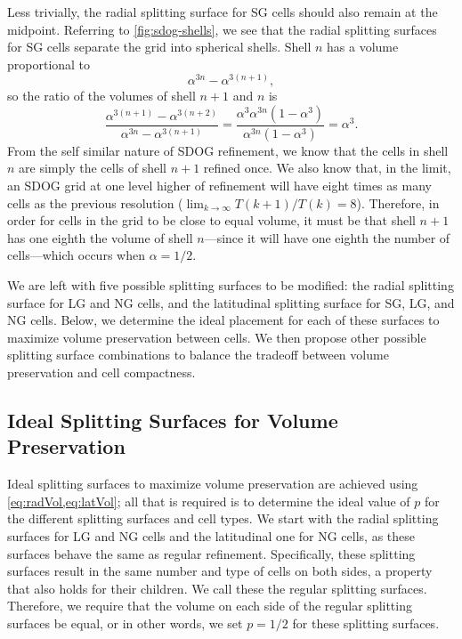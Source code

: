 Less trivially, the radial splitting surface for SG cells should also remain at the midpoint.
Referring to \cref{fig:sdog-shells}, we see that the radial splitting surfaces for SG cells separate the grid into spherical shells.
Shell $n$ has a volume proportional to
%
\begin{equation*}
\alpha^{3n} - \alpha^{3 \left( n + 1 \right)},
\end{equation*}
%
so the ratio of the volumes of shell $n+1$ and $n$ is
%
\begin{equation} \label{eq:shellVolume}
\frac{ \alpha^{3 \left(n + 1 \right)} - \alpha^{3\left( n + 2 \right)} }{ \alpha^{3n} - \alpha^{3 \left( n + 1 \right)} } = \frac{ \alpha^{3} \alpha^{3n} \left( 1 - \alpha^{3} \right) }{ \alpha^{3n} \left( 1 - \alpha^{3} \right) } = \alpha^{3}.
\end{equation}
%
From the self similar nature of SDOG refinement, we know that the cells in shell $n$ are simply the cells of shell $n+1$ refined once.
We also know that, in the limit, an SDOG grid at one level higher of refinement will have eight times as many cells as the previous resolution ($\lim_{k \to \infty} T(k+1) / T(k)  = 8 $).
Therefore, in order for cells in the grid to be close to equal volume, it must be that shell $n+1$ has one eighth the volume of shell $n$---since it will have one eighth the number of cells---which occurs when $\alpha = 1 / 2$.


We are left with five possible splitting surfaces to be modified: the radial splitting surface for LG and NG cells, and the latitudinal splitting surface for SG, LG, and NG cells.
Below, we determine the ideal placement for each of these surfaces to maximize volume preservation between cells.
We then propose other possible splitting surface combinations to balance the tradeoff between volume preservation and cell compactness.


\subsection{Ideal Splitting Surfaces for Volume Preservation} \label{chap:4:ideal}
Ideal splitting surfaces to maximize volume preservation are achieved using \cref{eq:radVol,eq:latVol}; all that is required is to determine the ideal value of $p$ for the different splitting surfaces and cell types.
We start with the radial splitting surfaces for LG and NG cells and the latitudinal one for NG cells, as these surfaces behave the same as regular refinement.
Specifically, these splitting surfaces result in the same number and type of cells on both sides, a property that also holds for their children.
We call these the regular splitting surfaces.
Therefore, we require that the volume on each side of the regular splitting surfaces be equal, or in other words, we set $p = 1/2$ for these splitting surfaces.


